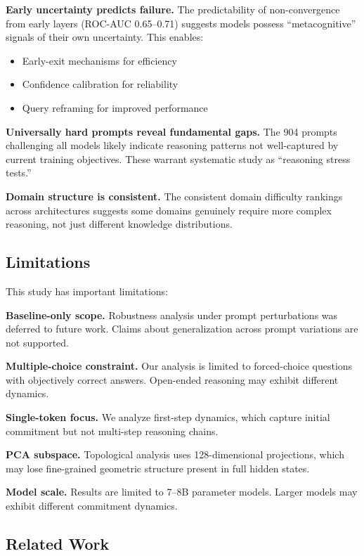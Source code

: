 \documentclass[11pt]{article}
\theoremstyle{definition}
\begin{document}
\textbf{Early uncertainty predicts failure.} The predictability of non-convergence from early layers (ROC-AUC 0.65--0.71) suggests models possess ``metacognitive'' signals of their own uncertainty. This enables:
\begin{itemize}
    \item Early-exit mechanisms for efficiency
    \item Confidence calibration for reliability
    \item Query reframing for improved performance
\end{itemize}

\textbf{Universally hard prompts reveal fundamental gaps.} The 904 prompts challenging all models likely indicate reasoning patterns not well-captured by current training objectives. These warrant systematic study as ``reasoning stress tests.''

\textbf{Domain structure is consistent.} The consistent domain difficulty rankings across architectures suggests some domains genuinely require more complex reasoning, not just different knowledge distributions.

\subsection{Limitations}

This study has important limitations:

\textbf{Baseline-only scope.} Robustness analysis under prompt perturbations was deferred to future work. Claims about generalization across prompt variations are not supported.

\textbf{Multiple-choice constraint.} Our analysis is limited to forced-choice questions with objectively correct answers. Open-ended reasoning may exhibit different dynamics.

\textbf{Single-token focus.} We analyze first-step dynamics, which capture initial commitment but not multi-step reasoning chains.

\textbf{PCA subspace.} Topological analysis uses 128-dimensional projections, which may lose fine-grained geometric structure present in full hidden states.

\textbf{Model scale.} Results are limited to 7--8B parameter models. Larger models may exhibit different commitment dynamics.

\subsection{Related Work}
\end{document}
